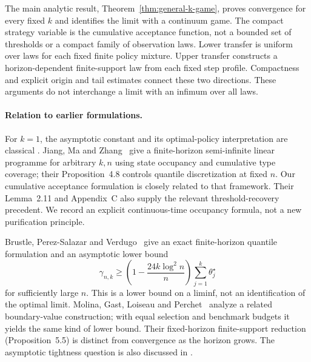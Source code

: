 \documentclass[11pt]{article}
\theoremstyle{remark}
\begin{document}
The main analytic result, Theorem~\ref{thm:general-k-game}, proves convergence for every fixed $k$ and identifies the limit with a continuum game. The compact strategy variable is the cumulative acceptance function, not a bounded set of thresholds or a compact family of observation laws. Lower transfer is uniform over laws for each fixed finite policy mixture. Upper transfer constructs a horizon-dependent finite-support law from each fixed step profile. Compactness and explicit origin and tail estimates connect these two directions. These arguments do not interchange a limit with an infimum over all laws.

\paragraph{Relation to earlier formulations.}
For $k=1$, the asymptotic constant and its optimal-policy interpretation are classical \cite{HK82,Kertz86,CFHOV21}. Jiang, Ma and Zhang~\cite[Definition~4.1, Eq.~(25), Theorem~4.2]{JMZ} give a finite-horizon semi-infinite linear programme for arbitrary $k,n$ using state occupancy and cumulative type coverage; their Proposition~4.8 controls quantile discretization at fixed $n$. Our cumulative acceptance formulation is closely related to that framework. Their Lemma~2.11 and Appendix~C also supply the relevant threshold-recovery precedent. We record an explicit continuous-time occupancy formula, not a new purification principle.

Brustle, Perez-Salazar and Verdugo~\cite[Theorems~1--2]{BPV} give an exact finite-horizon quantile formulation and an asymptotic lower bound
\[
 \gamma_{n,k}\ge\left(1-\frac{24k\log^2n}{n}\right)
                  \sum_{j=1}^k\theta_j^\star
\]
for sufficiently large $n$. This is a lower bound on a liminf, not an identification of the optimal limit. Molina, Gast, Loiseau and Perchet~\cite[Proposition~5.4, Eq.~(5.7)]{MGLP} analyze a related boundary-value construction; with equal selection and benchmark budgets it yields the same kind of lower bound. Their fixed-horizon finite-support reduction (Proposition~5.5) is distinct from convergence as the horizon grows. The asymptotic tightness question is also discussed in \cite{Brustle26}.
\end{document}
